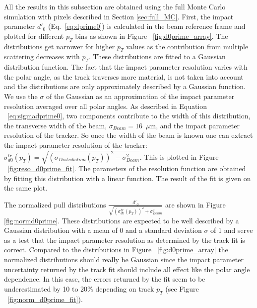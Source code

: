 \documentclass{cmspaper}
\begin{document}
   
All the results in this subsection are obtained using the full Monte Carlo simulation with pixels described in Section \ref{sec:full_MC}.
First, the impact parameter $d'_{0}$ (Eq.~\ref{eq:dprime0}) is calculated in the beam reference frame  and plotted for different $p_T$ bins as shown in  
Figure ~\ref{fig:d0prime_array}. 
The distributions get narrower for higher $p_T$ values as the contribution from multiple scattering decreases with $p_T$.
These distributions are fitted to a Gaussian distribution function. The fact that the impact parameter resolution varies with
the polar angle, as the track traverses more material, is not taken into account and the distributions are only approximately  
described by a Gaussian function. 
We use the $\sigma$ of the Gaussian as an approximation of the impact parameter resolution averaged over all polar angles. 
As described in Equation ~\ref{eq:sigmadprime0}, two components contribute to the width of this
distribution, the transverse width of the beam, $\sigma_{Beam}=16$~$\mu$m, and the impact parameter resolution of the tracker. 
So once the width of the beam is known one can extract the impact parameter resolution 
of the tracker: 
$\sigma^{tr}_{d0}(p_T) = \sqrt{(\sigma_{Distribution}(p_T))^2 -\sigma_{Beam}^2}$.
This is plotted in  Figure ~\ref{fig:reso_d0prime_fit}.
The parameters of the resolution function are obtained by fitting this distribution with a linear function. 
The result of the fit is given on the same plot.
 
The normalized pull distributions  $\frac{d'_{0}}{ \sqrt{(\sigma^{tr}_{d0}(p_T))^2 +\sigma_{Beam}^2}}$ are  shown in Figure \ref{fig:normd0prime}.
These distributions are expected to be well described by a Gaussian distribution with a mean of 0 and a standard deviation $\sigma$ of 1 and serve 
as a test that the impact parameter resolution as determined by the track fit is correct. Compared to the distributions  in Figure ~\ref{fig:d0prime_array}
the normalized distributions should really be Gaussian since the impact parameter uncertainty returned by the track fit should include all effect like the polar
angle dependence.  In this case, the errors returned by the fit seem to be underestimated by 
10 to 20\% depending on track $p_T$ (see Figure ~\ref{fig:norm_d0prime_fit}).   
\end{document}
